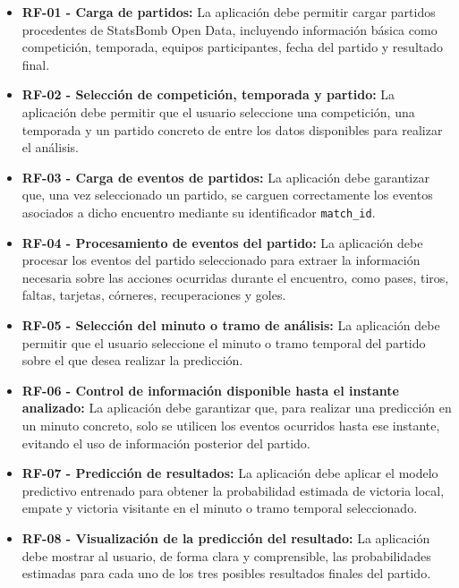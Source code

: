\begin{itemize}
    \item \textbf{RF-01 - Carga de partidos:} La aplicación debe permitir cargar partidos procedentes de StatsBomb Open Data, incluyendo información básica como competición, temporada, equipos participantes, fecha del partido y resultado final.

    \item \textbf{RF-02 - Selección de competición, temporada y partido:} La aplicación debe permitir que el usuario seleccione una competición, una temporada y un partido concreto de entre los datos disponibles para realizar el análisis.

    \item \textbf{RF-03 - Carga de eventos de partidos:} La aplicación debe garantizar que, una vez seleccionado un partido, se carguen correctamente los eventos asociados a dicho encuentro mediante su identificador \texttt{match\_id}.

    \item \textbf{RF-04 - Procesamiento de eventos del partido:} La aplicación debe procesar los eventos del partido seleccionado para extraer la información necesaria sobre las acciones ocurridas durante el encuentro, como pases, tiros, faltas, tarjetas, córneres, recuperaciones y goles.

    \item \textbf{RF-05 - Selección del minuto o tramo de análisis:} La aplicación debe permitir que el usuario seleccione el minuto o tramo temporal del partido sobre el que desea realizar la predicción.

    \item \textbf{RF-06 - Control de información disponible hasta el instante analizado:} La aplicación debe garantizar que, para realizar una predicción en un minuto concreto, solo se utilicen los eventos ocurridos hasta ese instante, evitando el uso de información posterior del partido.

    \item \textbf{RF-07 - Predicción de resultados:} La aplicación debe aplicar el modelo predictivo entrenado para obtener la probabilidad estimada de victoria local, empate y victoria visitante en el minuto o tramo temporal seleccionado.

    \item \textbf{RF-08 - Visualización de la predicción del resultado:} La aplicación debe mostrar al usuario, de forma clara y comprensible, las probabilidades estimadas para cada uno de los tres posibles resultados finales del partido.


\end{itemize}
